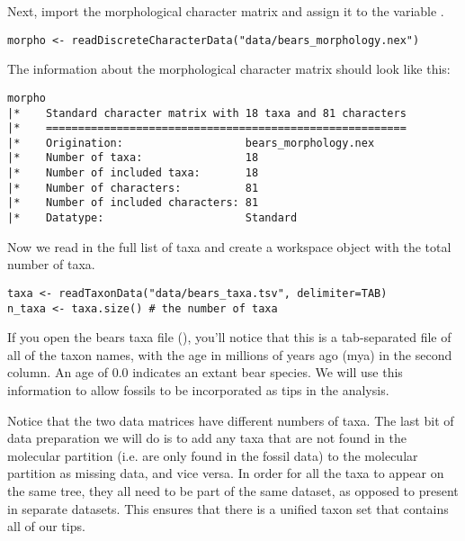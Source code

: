 Next, import the morphological character matrix and assign it to the variable . 
{\tt \begin{snugshade*}
\begin{lstlisting}
morpho <- readDiscreteCharacterData("data/bears_morphology.nex")
\end{lstlisting}
\end{snugshade*}}

The information about the morphological character matrix should look like this:

{\tt \begin{snugshade*}
\begin{lstlisting}
morpho
|*    Standard character matrix with 18 taxa and 81 characters
|*    ========================================================
|*    Origination:                   bears_morphology.nex
|*    Number of taxa:                18
|*    Number of included taxa:       18
|*    Number of characters:          81
|*    Number of included characters: 81
|*    Datatype:                      Standard
\end{lstlisting}
\end{snugshade*}}

Now we read in the full list of taxa and create a workspace object with the total number of taxa. 

{\tt \begin{snugshade*}
\begin{lstlisting}
taxa <- readTaxonData("data/bears_taxa.tsv", delimiter=TAB)
n_taxa <- taxa.size() # the number of taxa
\end{lstlisting}
\end{snugshade*}}

If you open the bears taxa file (), you'll notice that this is a tab-separated file of all of the taxon names, with the age in millions of years ago (mya) in the second column. 
An age of 0.0 indicates an extant bear species. 
We will use this information to allow fossils to be incorporated as tips in the analysis. 

Notice that the two data matrices have different numbers of taxa. The last bit of data preparation we will do is to add any taxa that are not found in the molecular partition (i.e. are only found in the fossil data) to the molecular partition as missing data, and vice versa.
In order for all the taxa to appear on the same tree, they all need to be part of the same dataset, as opposed to present in separate datasets. 
This ensures that there is a unified taxon set that contains all of our tips.

